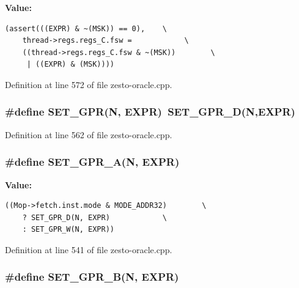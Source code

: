 \textbf{Value:}

\begin{Code}\begin{verbatim}(assert(((EXPR) & ~(MSK)) == 0),    \
    thread->regs.regs_C.fsw =            \
    ((thread->regs.regs_C.fsw & ~(MSK))        \
     | ((EXPR) & (MSK))))
\end{verbatim}
\end{Code}


Definition at line 572 of file zesto-oracle.cpp.
\subsubsection[{SET\_\-GPR}]{\setlength{\rightskip}{0pt plus 5cm}\#define SET\_\-GPR(N, \/  EXPR)~SET\_\-GPR\_\-D(N,EXPR)}\label{zesto-oracle_8cpp_68fae1b429c1b8849ca83f455ad6ea38}




Definition at line 562 of file zesto-oracle.cpp.
\subsubsection[{SET\_\-GPR\_\-A}]{\setlength{\rightskip}{0pt plus 5cm}\#define SET\_\-GPR\_\-A(N, \/  EXPR)}\label{zesto-oracle_8cpp_aaad11abd50c2dc2ff406fa27cf7678f}


\textbf{Value:}

\begin{Code}\begin{verbatim}((Mop->fetch.inst.mode & MODE_ADDR32)        \
    ? SET_GPR_D(N, EXPR)            \
    : SET_GPR_W(N, EXPR))
\end{verbatim}
\end{Code}


Definition at line 541 of file zesto-oracle.cpp.
\subsubsection[{SET\_\-GPR\_\-B}]{\setlength{\rightskip}{0pt plus 5cm}\#define SET\_\-GPR\_\-B(N, \/  EXPR)}\label{zesto-oracle_8cpp_d033dd2415fd695c9d1e8318b6341a2e}


